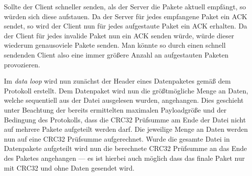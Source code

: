 Sollte der Client schneller senden, als der Server die Pakete aktuell empfängt, so würden sich diese aufstauen.
Da der Server für jedes empfangene Paket ein ACK sendet, so wird der Client nun für jedes aufgestaute Paket ein ACK erhalten.
Da der Client für jedes invalide Paket nun ein ACK senden würde, würde dieser wiederum genausoviele Pakete senden.
Man könnte so durch einen schnell sendenden Client also eine immer größere Anzahl an aufgestauten Paketen provozieren. \newline

Im \textit{data loop} wird nun zunächst der Header eines Datenpaketes gemäß dem Protokoll erstellt.
Dem Datenpaket wird nun die größtmögliche Menge an Daten, welche sequentiell aus der Datei ausgelesen wurden, angehangen.
Dies geschieht unter Beachtung der bereits ermittelten maximalen Payloadgröße und der Bedingung des Protokolls, dass die CRC32 Prüfsumme am Ende der Datei nicht auf mehrere Pakete aufgeteilt werden darf.
Die jeweilige Menge an Daten werden nun auf eine CRC32 Prüfsumme aufgerechnet.
Wurde die gesamte Datei in Datenpakete aufgeteilt wird nun die berechnete CRC32 Prüfsumme an das Ende des Paketes angehangen --- es ist hierbei auch möglich dass das finale Paket nur mit CRC32 und ohne Daten gesendet wird.


